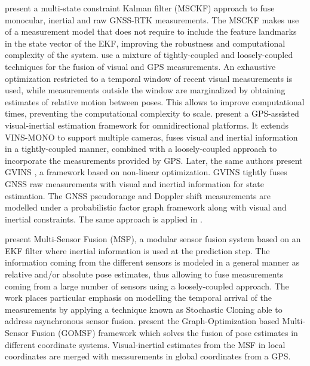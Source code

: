 \citet{li2019tight} present a multi-state constraint Kalman filter (MSCKF) approach to fuse monocular, inertial and raw GNSS-RTK measurements. The MSCKF makes use of a measurement model that does not require to include the feature landmarks in the state vector of the EKF, improving the robustness and computational complexity of the system. \citet{salehi2017hybrid} use a mixture of tightly-coupled and loosely-coupled techniques for the fusion of visual and GPS measurements. An exhaustive optimization restricted to a temporal window of recent visual measurements is used, while measurements outside the window are marginalized by obtaining estimates of relative motion between poses. This allows to improve computational times, preventing the computational complexity to scale. \citet{yu2019gpsaided} present a GPS-assisted visual-inertial estimation framework for omnidirectional platforms. It extends VINS-MONO \cite{qin2018vins} to support multiple cameras, fuses visual and inertial information in a tightly-coupled manner, combined with a loosely-coupled approach to incorporate the measurements provided by GPS. Later, the same authors present GVINS \cite{cao2021gvins}, a framework based on non-linear optimization. GVINS tightly fuses GNSS raw measurements with visual and inertial information for state estimation. The GNSS pseudorange and Doppler shift measurements are modelled under a probabilistic factor graph framework along with visual and inertial constraints. The same approach is applied in \cite{liu2021optimization}.

\citet{lynen2013robust} present Multi-Sensor Fusion (MSF), a modular sensor fusion system based on an EKF filter where inertial information is used at the prediction step. The information coming from the different sensors is modeled in a general manner as relative and/or absolute pose estimates, thus allowing to fuse measurements coming from a large number of sensors using a loosely-coupled approach. The work places particular emphasis on modelling the temporal arrival of the measurements by applying a technique known as Stochastic Cloning able to address asynchronous sensor fusion. \citet{mascaro2018gomsf} present the Graph-Optimization based Multi-Sensor Fusion (GOMSF) framework which solves the fusion of pose estimates in different coordinate systems. Visual-inertial estimates from the MSF in local coordinates are merged with measurements in global coordinates from a GPS. %

